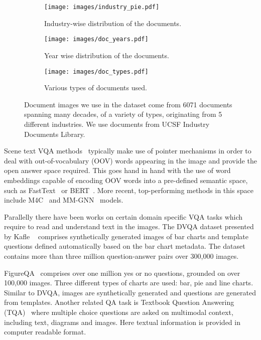 \documentclass[10pt,twocolumn,letterpaper]{article}
\begin{document}
\begin{figure*}[ht]
    \centering
    \begin{subfigure}[t]{0.32\textwidth}
        \texttt{[image: images/industry\_pie.pdf]}
        \caption{Industry-wise distribution of the documents.}
        \label{fig:industry_distr}
    \end{subfigure}
    \hspace{1mm}
    \begin{subfigure}[t]{0.32\textwidth}
        \texttt{[image: images/doc\_years.pdf]}
        \caption{Year wise distribution of the documents.}
        \label{fig:doc_year_distr}
    \end{subfigure}
    \hspace{1mm}
    \begin{subfigure}[t]{0.32\textwidth}
        \texttt{[image: images/doc\_types.pdf]}
        \caption{Various types of documents used.}
        \label{fig:doc_type_distr}
    \end{subfigure}
\caption{Document images we use in the dataset come from 6071  documents spanning many decades, of a variety of types, originating from 5 different industries. We use documents from UCSF Industry Documents Library.}
\vspace{-2mm}

\end{figure*}
Scene text VQA methods~\cite{m4c, gao2020multi, textvqa, gomez2020multimodal}
typically make use of pointer mechanisms in order to deal with out-of-vocabulary (OOV) words appearing in the image and provide the open answer space required. This goes hand in hand with the use of word embeddings capable of encoding OOV words into a pre-defined semantic space,  such as FastText~\cite{bojanowski2017enriching} or BERT~\cite{bert}. More recent, top-performing methods in this space include M4C~\cite{m4c} and MM-GNN~\cite{gao2020multi} models.


Parallelly there have been works on certain domain specific VQA tasks which require to read and understand text in the images.
The DVQA dataset presented by Kafle \etal~\cite{kafle2020answering, dvqa} comprises synthetically generated images of bar charts and template questions defined automatically based on the bar chart metadata. The dataset contains more than three million question-answer pairs over 300,000 images.


FigureQA~\cite{kahou2017figureqa} comprises over one million yes or no questions, grounded on over 100,000 images. Three different types of charts are used: bar, pie and line charts. Similar to DVQA, images are synthetically generated and questions are  generated from templates.
Another related QA task is  Textbook Question Answering (TQA)~\cite{textbookqa} where multiple choice questions are asked on multimodal context, including text, diagrams and images. Here textual information is provided in computer readable format. 
\end{document}
